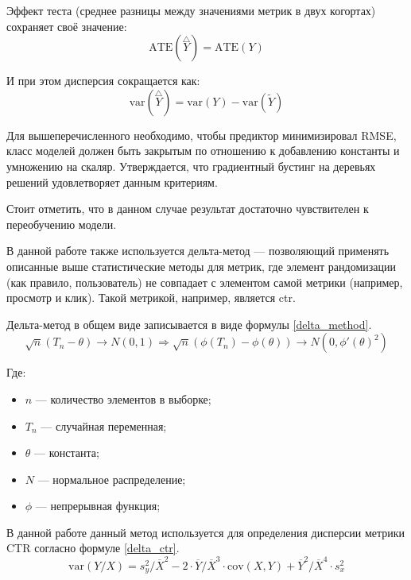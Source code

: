 \documentclass[../document.tex]{subfiles}
\begin{document}
	\par Эффект теста (среднее разницы между значениями метрик в двух когортах) сохраняет своё значение:
	\begin{equation}
		\text{ATE}(\overset{\triangle}{Y})=\text{ATE}(Y)
	\end{equation}
	\par И при этом дисперсия сокращается как:
	\begin{equation}
		\text{var}(\overset{\triangle}{Y})=\text{var}(Y)-\text{var}(\tilde{Y})
	\end{equation}
	\par Для вышеперечисленного необходимо, чтобы предиктор минимизировал RMSE, класс моделей должен быть закрытым по отношению к добавлению константы и умножению на скаляр. Утверждается, что градиентный бустинг на деревьях решений удовлетворяет данным критериям.
	\par Стоит отметить, что в данном случае результат достаточно чувствителен к переобучению модели.
	\par В данной работе также используется дельта-метод \cite{delta_method} --- позволяющий применять описанные выше статистические методы для метрик, где элемент рандомизации (как правило, пользователь) не совпадает с элементом самой метрики (например, просмотр и клик). Такой метрикой, например, является \gls{ctr}.
	\par Дельта-метод в общем виде записывается в виде формулы \ref{delta_method}.
	\begin{equation}
		\label{delta_method}
		\sqrt{n}(T_n-\theta)\to N(0,1) \Rightarrow \sqrt{n}(\phi(T_n)-\phi(\theta))\to N(0,\phi'(\theta)^2)
	\end{equation}
	\par Где:
	\begin{itemize}
		\item $n$ --- количество элементов в выборке;
		\item $T_n$ --- случайная переменная;
		\item $\theta$ --- константа;
		\item $N$ --- нормальное распределение;
		\item $\phi$ --- непрерывная функция;
	\end{itemize}
	\par В данной работе данный метод используется для определения дисперсии метрики CTR \cite{vk_stats} согласно формуле \ref{delta_ctr}.
	\begin{equation}
		\label{delta_ctr}
		\text{var}(Y/X)=s^2_y/\overline{X}^2-2\cdot\overline{Y}/\overline{X}^3\cdot \text{cov}(X,Y)+\overline{Y}^2/\overline{X}^4\cdot s^2_x
	\end{equation}
\end{document}

